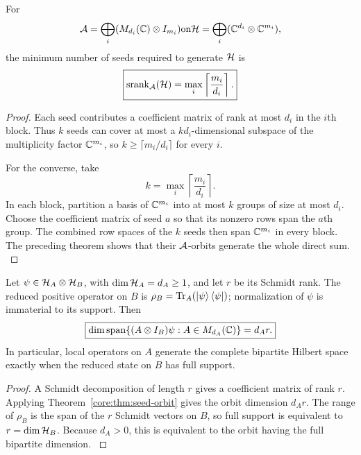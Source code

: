 \begin{theorem}\label{core:theorem:002}\label{core:thm:seed-rank}
For
\[
\cA=\bigoplus_i(M_{d_i}(\bbC)\otimes I_{m_i})
\quad\text{on}\quad
\cH=\bigoplus_i(\bbC^{d_i}\otimes\bbC^{m_i}),
\]
the minimum number of seeds required to generate $\cH$ is
\[
\boxed{
\operatorname{srank}_{\cA}(\cH)
=
\max_i\left\lceil\frac{m_i}{d_i}\right\rceil.
}
\]
\end{theorem}

\begin{proof}\label{core:proof:002}
Each seed contributes a coefficient matrix of rank at most $d_i$ in the $i$th block. Thus $k$ seeds can cover at most a $kd_i$-dimensional subspace of the multiplicity factor $\bbC^{m_i}$, so $k\ge\lceil m_i/d_i\rceil$ for every $i$.

For the converse, take
\[
k=\max_i\left\lceil\frac{m_i}{d_i}\right\rceil.
\]
In each block, partition a basis of $\bbC^{m_i}$ into at most $k$ groups of size at most $d_i$. Choose the coefficient matrix of seed $a$ so that its nonzero rows span the $a$th group. The combined row spaces of the $k$ seeds then span $\bbC^{m_i}$ in every block. The preceding theorem shows that their $\cA$-orbits generate the whole direct sum.
\label{core:proof:002:end}\end{proof}

\begin{corollary}\label{core:corollary:001}\label{core:thm:schmidt}
Let $\psi\in\cH_A\otimes\cH_B$, with $\dim\cH_A=d_A\ge1$, and let $r$ be its Schmidt rank. The reduced positive operator on $B$ is $\rho_B=\operatorname{Tr}_A(\left|\psi\right\rangle\left\langle\psi\right|)$; normalization of $\psi$ is immaterial to its support. Then
\[
\boxed{
\dim\operatorname{span}\{(A\otimes I_B)\psi:A\in M_{d_A}(\bbC)\}
=d_A r.
}
\]
In particular, local operators on $A$ generate the complete bipartite Hilbert space exactly when the reduced state on $B$ has full support.
\end{corollary}

\begin{proof}\label{core:proof:003}
A Schmidt decomposition of length $r$ gives a coefficient matrix of rank $r$. Applying Theorem~\ref{core:thm:seed-orbit} gives the orbit dimension $d_A r$. The range of $\rho_B$ is the span of the $r$ Schmidt vectors on $B$, so full support is equivalent to $r=\dim\cH_B$. Because $d_A>0$, this is equivalent to the orbit having the full bipartite dimension.
\label{core:proof:003:end}\end{proof}

